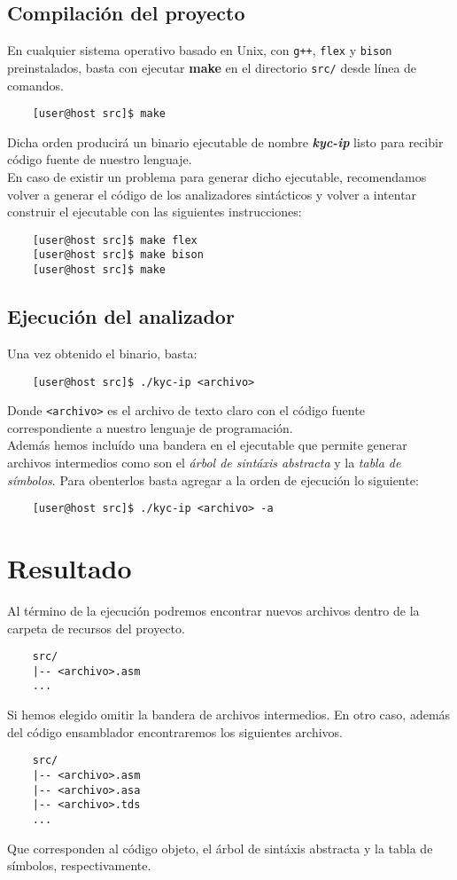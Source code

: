 \documentclass[12pt]{article}
\begin{document}
\subsection{Compilación del proyecto}

En cualquier sistema operativo basado en Unix, con \texttt{g++}, \texttt{flex} y \texttt{bison} preinstalados, basta con ejecutar \textbf{make} en el directorio \texttt{src/} desde línea de comandos.

\begin{verbatim}
    [user@host src]$ make
\end{verbatim}

Dicha orden producirá un binario ejecutable de nombre \textit{\textbf{kyc-ip}} listo para recibir código fuente de nuestro lenguaje.\\

En caso de existir un problema para generar dicho ejecutable, recomendamos volver a generar el código de los analizadores sintácticos y volver a intentar construir el ejecutable con las siguientes instrucciones:

\begin{verbatim}
    [user@host src]$ make flex
    [user@host src]$ make bison
    [user@host src]$ make
\end{verbatim}


\subsection{Ejecución del analizador} 

Una vez obtenido el binario, basta:
\begin{verbatim}
    [user@host src]$ ./kyc-ip <archivo>
\end{verbatim}
Donde \texttt{<archivo>} es el archivo de texto claro con el código fuente correspondiente a nuestro lenguaje de programación.\\

Además hemos incluído una bandera en el ejecutable que permite generar archivos intermedios
como son el \textit{árbol de sintáxis abstracta} y la \textit{tabla de símbolos}. Para obenterlos
basta agregar a la orden de ejecución lo siguiente:
\begin{verbatim}
    [user@host src]$ ./kyc-ip <archivo> -a
\end{verbatim}
\newpage
\section{Resultado}
Al término de la ejecución podremos encontrar nuevos archivos dentro de la carpeta de recursos del
proyecto.
\begin{verbatim}
    src/
    |-- <archivo>.asm
    ...
\end{verbatim}
Si hemos elegido omitir la bandera de archivos intermedios. En otro caso, además del código ensamblador encontraremos los siguientes archivos.
\begin{verbatim}
    src/
    |-- <archivo>.asm
    |-- <archivo>.asa
    |-- <archivo>.tds
    ...
\end{verbatim}
Que corresponden al código objeto, el árbol de sintáxis abstracta y la tabla de símbolos, respectivamente.
\end{document}
